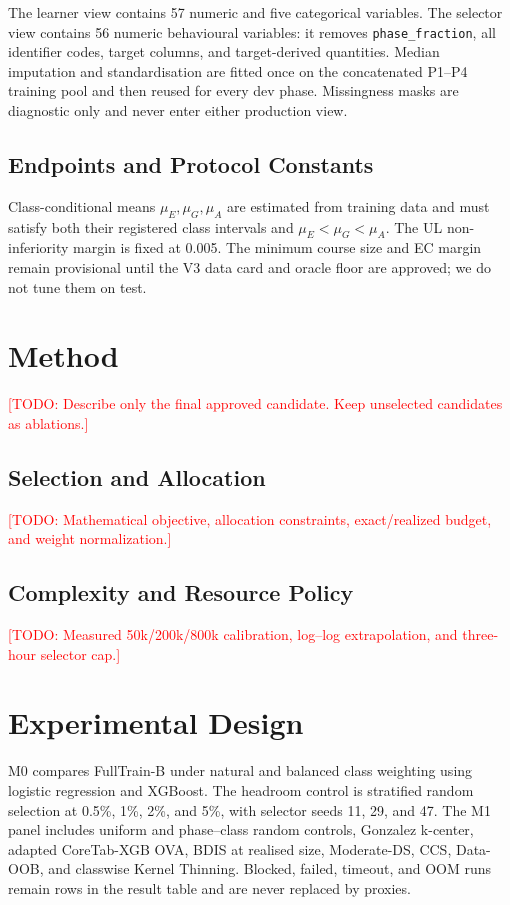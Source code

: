 \documentclass[runningheads]{llncs}
\newcommand{\todoitem}[1]{\par\noindent\textcolor{red}{[TODO: #1]}\par}
\begin{document}
The learner view contains 57 numeric and five categorical variables.  The
selector view contains 56 numeric behavioural variables: it removes
\texttt{phase\_fraction}, all identifier codes, target columns, and
target-derived quantities.  Median imputation and standardisation are fitted
once on the concatenated P1--P4 training pool and then reused for every dev
phase.  Missingness masks are diagnostic only and never enter either production
view.
\subsection{Endpoints and Protocol Constants}
Class-conditional means $\mu_E,\mu_G,\mu_A$ are estimated from training data and
must satisfy both their registered class intervals and
$\mu_E<\mu_G<\mu_A$.  The UL non-inferiority margin is fixed at 0.005.  The
minimum course size and EC margin remain provisional until the V3 data card and
oracle floor are approved; we do not tune them on test.

\section{Method}
\todoitem{Describe only the final approved candidate. Keep unselected candidates as ablations.}
\subsection{Selection and Allocation}
\todoitem{Mathematical objective, allocation constraints, exact/realized budget, and weight normalization.}
\subsection{Complexity and Resource Policy}
\todoitem{Measured 50k/200k/800k calibration, log--log extrapolation, and three-hour selector cap.}

\section{Experimental Design}
M0 compares FullTrain-B under natural and balanced class weighting using
logistic regression and XGBoost.  The headroom control is stratified random
selection at 0.5\%, 1\%, 2\%, and 5\%, with selector seeds 11, 29, and 47.
The M1 panel includes uniform and phase--class random controls, Gonzalez
k-center, adapted CoreTab-XGB OVA, BDIS at realised size, Moderate-DS, CCS,
Data-OOB, and classwise Kernel Thinning.  Blocked, failed, timeout, and OOM runs
remain rows in the result table and are never replaced by proxies.
\end{document}
